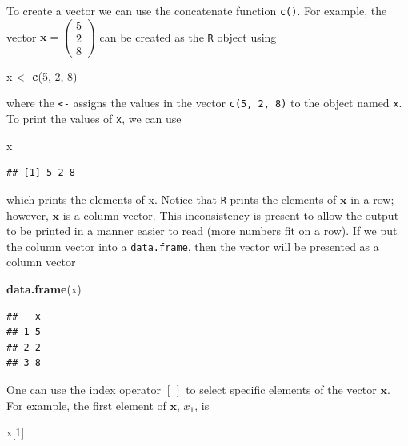 \documentclass[
]{book}
\newenvironment{Shaded}{\begin{snugshade}}{\end{snugshade}}
\newcommand{\DecValTok}[1]{\textcolor[rgb]{0.00,0.00,0.81}{#1}}
\newcommand{\KeywordTok}[1]{\textcolor[rgb]{0.13,0.29,0.53}{\textbf{#1}}}
\newcommand{\NormalTok}[1]{#1}
\newcommand{\StringTok}[1]{\textcolor[rgb]{0.31,0.60,0.02}{#1}}
\theoremstyle{definition}
\theoremstyle{definition}
\theoremstyle{definition}
\theoremstyle{remark}
\begin{document}
To create a vector we can use the concatenate function \texttt{c()}. For example, the vector \(\mathbf{x} = \begin{pmatrix} 5 \\ 2 \\ 8 \end{pmatrix}\) can be created as the \texttt{R} object using

\begin{Shaded}
\begin{Highlighting}[]
\NormalTok{x <-}\StringTok{ }\KeywordTok{c}\NormalTok{(}\DecValTok{5}\NormalTok{, }\DecValTok{2}\NormalTok{, }\DecValTok{8}\NormalTok{)}
\end{Highlighting}
\end{Shaded}

where the \texttt{\textless{}-} assigns the values in the vector \texttt{c(5,\ 2,\ 8)} to the object named \texttt{x}. To print the values of \texttt{x}, we can use

\begin{Shaded}
\begin{Highlighting}[]
\NormalTok{x}
\end{Highlighting}
\end{Shaded}

\begin{verbatim}
## [1] 5 2 8
\end{verbatim}

which prints the elements of x. Notice that \texttt{R} prints the elements of \(\mathbf{x}\) in a row; however, \(\mathbf{x}\) is a column vector. This inconsistency is present to allow the output to be printed in a manner easier to read (more numbers fit on a row). If we put the column vector into a \texttt{data.frame}, then the vector will be presented as a column vector

\begin{Shaded}
\begin{Highlighting}[]
\KeywordTok{data.frame}\NormalTok{(x)}
\end{Highlighting}
\end{Shaded}

\begin{verbatim}
##   x
## 1 5
## 2 2
## 3 8
\end{verbatim}

One can use the index operator \([\ ]\) to select specific elements of the vector \(\mathbf{x}\). For example, the first element of \(\mathbf{x}\), \(x_1\), is

\begin{Shaded}
\begin{Highlighting}[]
\NormalTok{x[}\DecValTok{1}\NormalTok{]}
\end{Highlighting}
\end{Shaded}
\end{document}
